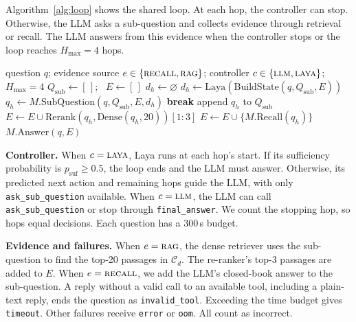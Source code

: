 Algorithm~\ref{alg:loop} shows the shared loop. At each hop, the controller can stop.
Otherwise, the LLM asks a sub-question and collects evidence through retrieval or recall.
The LLM answers from this evidence when the controller stops or the loop reaches
$H_{\max}=4$ hops.

\begin{algorithm}[t]
  \caption{Decomposition loop shared by the four conditions. Retrieved passages are
  de-duplicated by passage id and capped at $|E|\le8$.}
    \label{alg:loop}
    \raggedright%

  \begin{algorithmic}[1]
    \Require question $q$; evidence source $e\in\{\textsc{recall},\textsc{rag}\}$;
             controller $c\in\{\textsc{llm},\textsc{laya}\}$; $H_{\max}=4$
    \State $Q_{\mathrm{sub}}\gets[\,]$; \ $E\gets[\,]$
      \State $d_h\gets\varnothing$ 
        \State $d_h\gets\mathrm{Laya}(\mathrm{BuildState}(q,Q_{\mathrm{sub}},E))$
         
      \EndIf
      \State $q_h\gets M.\mathrm{SubQuestion}(q,Q_{\mathrm{sub}},E,d_h)$
        \State \textbf{break}
      \EndIf
      \State append $q_h$ to $Q_{\mathrm{sub}}$
        \State $E\gets E\cup\mathrm{Rerank}(q_h,\mathrm{Dense}(q_h,20))[1{:}3]$
      \Else
        \State $E\gets E\cup\{M.\mathrm{Recall}(q_h)\}$
      \EndIf
    \EndFor
    \State \Return $M.\mathrm{Answer}(q,E)$
  \end{algorithmic}
\end{algorithm}

\textbf{Controller.} When $c=\textsc{laya}$, Laya runs at each hop's start. If its
sufficiency probability is $p_{\mathrm{suf}}\ge0.5$, the loop ends and the LLM must
answer. Otherwise, its predicted next action and remaining hops guide the LLM, with
only \texttt{ask\_sub\_question} available. When $c=\textsc{llm}$, the LLM can call
\texttt{ask\_sub\_question} or stop through \texttt{final\_answer}. We count the
stopping hop, so hops equal decisions. Each
question has a 300\,s budget.

\textbf{Evidence and failures.} When $e=\textsc{rag}$, the dense retriever uses the
sub-question to find the top-20 passages in $\mathcal{C}_d$. The re-ranker's top-3
passages are added to $E$. When $e=\textsc{recall}$, we add the LLM's closed-book answer
to the sub-question. A reply without a valid call to an available tool, including a
plain-text reply, ends the question as \texttt{invalid\_tool}. Exceeding the time budget
gives \texttt{timeout}. Other failures receive \texttt{error} or \texttt{oom}. All count
as incorrect.


